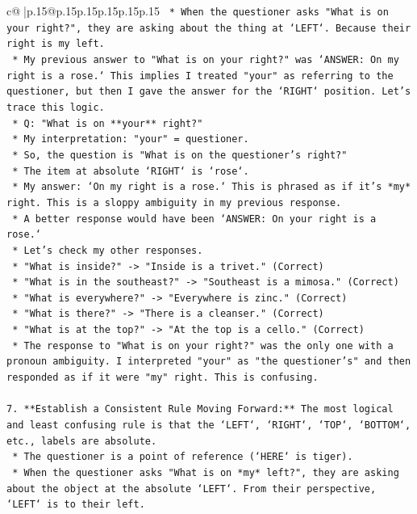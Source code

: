 \documentclass{article}
\begin{document}
{\begin{supertabular}{c@{$\;$}|p{.15\linewidth}@{}p{.15\linewidth}p{.15\linewidth}p{.15\linewidth}p{.15\linewidth}p{.15\linewidth}}
{{{\texttt{    *   When the questioner asks "What is on your right?", they are asking about the thing at `LEFT`. Because their right is my left.} \\
\texttt{    *   My previous answer to "What is on your right?" was `ANSWER: On my right is a rose.` This implies I treated "your" as referring to the questioner, but then I gave the answer for the `RIGHT` position. Let's trace this logic.} \\
\texttt{        *   Q: "What is on **your** right?"} \\
\texttt{        *   My interpretation: "your" = questioner.} \\
\texttt{        *   So, the question is "What is on the questioner's right?"} \\
\texttt{        *   The item at absolute `RIGHT` is `rose`.} \\
\texttt{        *   My answer: `On my right is a rose.` This is phrased as if it's *my* right. This is a sloppy ambiguity in my previous response.} \\
\texttt{        *   A better response would have been `ANSWER: On your right is a rose.`} \\
\texttt{        *   Let's check my other responses.} \\
\texttt{            *   "What is inside?" {-}> "Inside is a trivet." (Correct)} \\
\texttt{            *   "What is in the southeast?" {-}> "Southeast is a mimosa." (Correct)} \\
\texttt{            *   "What is everywhere?" {-}> "Everywhere is zinc." (Correct)} \\
\texttt{            *   "What is there?" {-}> "There is a cleanser." (Correct)} \\
\texttt{            *   "What is at the top?" {-}> "At the top is a cello." (Correct)} \\
\texttt{    *   The response to "What is on your right?" was the only one with a pronoun ambiguity. I interpreted "your" as "the questioner's" and then responded as if it were "my" right. This is confusing.} \\
\\ 
\texttt{7.  **Establish a Consistent Rule Moving Forward:** The most logical and least confusing rule is that the `LEFT`, `RIGHT`, `TOP`, `BOTTOM`, etc., labels are absolute.} \\
\texttt{    *   The questioner is a point of reference (`HERE` is tiger).} \\
\texttt{    *   When the questioner asks "What is on *my* left?", they are asking about the object at the absolute `LEFT`. From their perspective, `LEFT` is to their left.} \\
}}}
\end{supertabular}}
\end{document}
